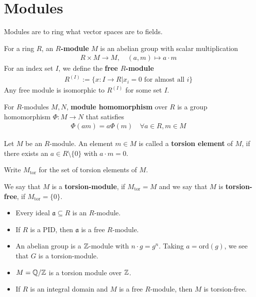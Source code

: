 \section{Modules}
Modules are to ring what vector spaces are to fields.

\begin{dfn}
  For a ring $R$, an \textbf{$R$-module} $M$ is an abelian group with scalar multiplication
\begin{align*}
  R \times M \to  M, \quad (a,m) \mapsto a \cdot m
\end{align*}
For an index set $I$, we define the \textbf{free $R$-module}
\begin{align*}
  R^{(I)} := \{x: I \to R \big\vert x_i = 0 \text{ for almost all $i$}\}
\end{align*}
Any free module is isomorphic to $R^{(I)}$ for some set $I$.

For $R$-modules $M,N$, \textbf{module homomorphism} over $R$ is a group homomorphism $\Phi: M \to N$ that satisfies
\begin{align*}
  \Phi(am) = a \Phi(m) \quad \forall a \in R, m \in M
\end{align*}
\end{dfn}

\begin{dfn}
Let $M$ be an $R$-module.
An element $m \in M$ is called a \textbf{torsion element} of $M$, if there exists an $a \in R \setminus \{0\}$ with $a \cdot m = 0$.

Write $M_{\text{tor}}$ for the set of torsion elements of $M$.

We say that $M$ is a \textbf{torsion-module}, if $M_{\text{tor}} = M$ and we say that $M$ is \textbf{torsion-free}, if $M_{\text{tor}} = \{0\}$.
\end{dfn}


\begin{itemize}
  \item Every ideal $\mathfrak{a} \subseteq R$ is an $R$-module.
  \item If $R$ is a PID, then $\mathfrak{a}$ is a free $R$-module.
  \item An abelian group is a $\mathbb{Z}$-module with $n \cdot g = g^{n}$.
    Taking $a = \text{ord}(g)$, we see that $G$ is a torsion-module.

  \item $M = \mathbb{Q}/\mathbb{Z}$ is a torsion module over $\mathbb{Z}$.
  \item If $R$ is an integral domain and $M$ is a free $R$-module, then $M$ is torsion-free.
\end{itemize}





